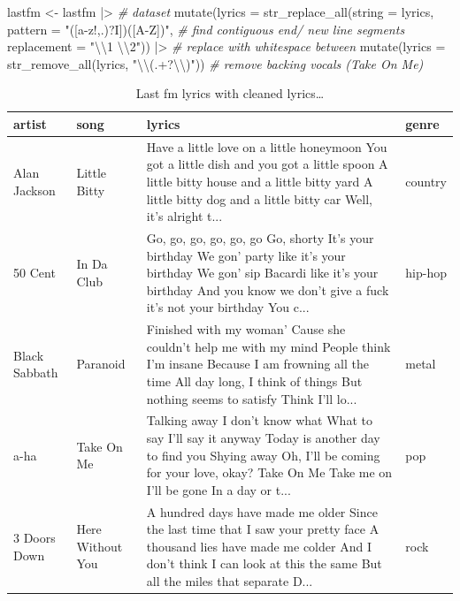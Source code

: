 \documentclass[
  letterpaper,
]{latex/krantz}
\newenvironment{Shaded}{\begin{snugshade}}{\end{snugshade}}
\newcommand{\AttributeTok}[1]{\textcolor[rgb]{0.00,0.00,0.00}{#1}}
\newcommand{\CommentTok}[1]{\textcolor[rgb]{0.00,0.00,0.00}{\textit{#1}}}
\newcommand{\FunctionTok}[1]{\textcolor[rgb]{0.00,0.00,0.00}{#1}}
\newcommand{\NormalTok}[1]{\textcolor[rgb]{0.00,0.00,0.00}{#1}}
\newcommand{\OtherTok}[1]{\textcolor[rgb]{0.00,0.00,0.00}{#1}}
\newcommand{\SpecialCharTok}[1]{\textcolor[rgb]{0.00,0.00,0.00}{#1}}
\newcommand{\StringTok}[1]{\textcolor[rgb]{0.00,0.00,0.00}{#1}}
\begin{document}
\begin{Shaded}
\begin{Highlighting}[]
\NormalTok{lastfm }\OtherTok{\textless{}{-}} 
\NormalTok{  lastfm }\SpecialCharTok{|\textgreater{}} \CommentTok{\# dataset}
  \FunctionTok{mutate}\NormalTok{(}\AttributeTok{lyrics =} 
           \FunctionTok{str\_replace\_all}\NormalTok{(}\AttributeTok{string =}\NormalTok{ lyrics, }
                           \AttributeTok{pattern =} \StringTok{"([a{-}z\textquotesingle{}!,.)?I])([A{-}Z])"}\NormalTok{, }\CommentTok{\# find contiguous end/ new line segments}
                           \AttributeTok{replacement =} \StringTok{"}\SpecialCharTok{\textbackslash{}\textbackslash{}}\StringTok{1 }\SpecialCharTok{\textbackslash{}\textbackslash{}}\StringTok{2"}\NormalTok{)) }\SpecialCharTok{|\textgreater{}}  \CommentTok{\# replace with whitespace between}
  \FunctionTok{mutate}\NormalTok{(}\AttributeTok{lyrics =} \FunctionTok{str\_remove\_all}\NormalTok{(lyrics, }\StringTok{"}\SpecialCharTok{\textbackslash{}\textbackslash{}}\StringTok{(.+?}\SpecialCharTok{\textbackslash{}\textbackslash{}}\StringTok{)"}\NormalTok{)) }\CommentTok{\# remove backing vocals (Take On Me)}
\end{Highlighting}
\end{Shaded}

\hypertarget{tbl-td-lastfm-clean-end-lines-preview}{}
\begin{table}
\caption{\label{tbl-td-lastfm-clean-end-lines-preview}Last fm lyrics with cleaned lyrics\ldots{} }\tabularnewline

\centering
\begin{tabular}{llll}
\toprule
artist & song & lyrics & genre\\
\midrule
Alan Jackson & Little Bitty & Have a little love on a little honeymoon You got a little dish and you got a little spoon A little bitty house and a little bitty yard A little bitty dog and a little bitty car Well, it's alright t... & country\\
50 Cent & In Da Club & Go, go, go, go, go, go Go, shorty It's your birthday We gon' party like it's your birthday We gon' sip Bacardi like it's your birthday And you know we don't give a fuck it's not your birthday You c... & hip-hop\\
Black Sabbath & Paranoid & Finished with my woman' Cause she couldn't help me with my mind People think I'm insane Because I am frowning all the time All day long, I think of things But nothing seems to satisfy Think I'll lo... & metal\\
a-ha & Take On Me & Talking away I don't know what What to say I'll say it anyway Today is another day to find you Shying away Oh, I'll be coming for your love, okay? Take On Me  Take me on  I'll be gone In a day or t... & pop\\
3 Doors Down & Here Without You & A hundred days have made me older Since the last time that I saw your pretty face A thousand lies have made me colder And I don't think I can look at this the same But all the miles that separate D... & rock\\
\bottomrule
\end{tabular}
\end{table}
\end{document}
